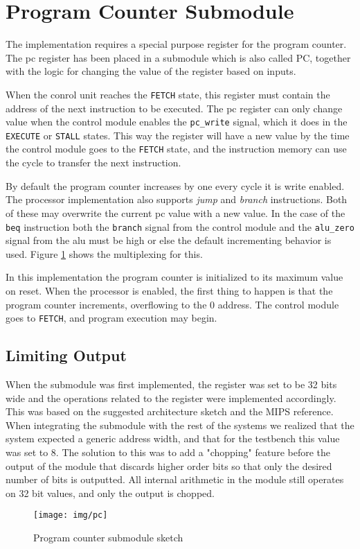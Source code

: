 \section{Program Counter Submodule}
The implementation requires a special purpose register for the program counter.
The \gls{pc} register has been placed in a submodule which is also called PC,
together with the logic for changing the value of the register based on inputs.

When the conrol unit reaches the \texttt{FETCH} state,
this register must contain the address of the next instruction to be executed.
The \gls{pc} register can only change value when the control module enables the \texttt{pc\_write} signal,
which it does in the \texttt{EXECUTE} or \texttt{STALL} states.
This way the register will have a new value by the time the control module goes to the \texttt{FETCH} state,
and the instruction memory can use the cycle to transfer the next instruction.

By default the program counter increases by one every cycle it is write enabled.
The processor implementation also supports \textit{jump} and \textit{branch} instructions.
Both of these may overwrite the current \gls{pc} value with a new value.
In the case of the \texttt{beq} instruction both the \texttt{branch} signal from the control module and the \texttt{alu\_zero} signal from the \gls{alu} must be high or else the default incrementing behavior is used.
Figure \ref{fig:pc} shows the multiplexing for this.

In this implementation the program counter is initialized to its maximum value on reset.
When the processor is enabled,
the first thing to happen is that the program counter increments,
overflowing to the 0 address.
The control module goes to \texttt{FETCH},
and program execution may begin.

\subsection{Limiting Output}
When the submodule was first implemented,
the register was set to be 32 bits wide and the operations related to the register were implemented accordingly.
This was based on the suggested architecture sketch and the MIPS reference\cite[Appendix D]{bib:compendium}.
When integrating the submodule with the rest of the systems we realized that the system expected a generic address width,
and that for the testbench this value was set to 8.
The solution to this was to add a "chopping" feature before the output of the module that discards higher order bits so that only the desired number of bits is outputted.
All internal arithmetic in the module still operates on 32 bit values,
and only the output is chopped.

\begin{figure}[p]
    \centering
    \texttt{[image: img/pc]}
    \caption{Program counter submodule sketch}
    \label{fig:pc}
\end{figure}

